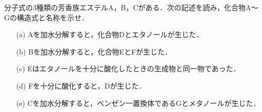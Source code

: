 \documentclass[a4paper,11pt]{ltjarticle}
\begin{document}
\ans
\newpage
\begin{que}
分子式の3種類の芳香族エステルA，B，Cがある．次の記述を読み，化合物A〜Gの構造式と名称を示せ．
\begin{itemize}
   \item [(a)]Aを加水分解すると，化合物Dとエタノールが生じた．
\item [(b)]Bを加水分解すると，化合物EとFが生じた．
\item [(c)]Eはエタノールを十分に酸化したときの生成物と同一物であった．
\item [(d)]Fを十分に酸化すると，Dが生じた．
\item [(e)]Cを加水分解すると，ベンゼン一置換体であるGとメタノールが生じた．
\end{itemize}
\end{que}
\ans
\end{document}
